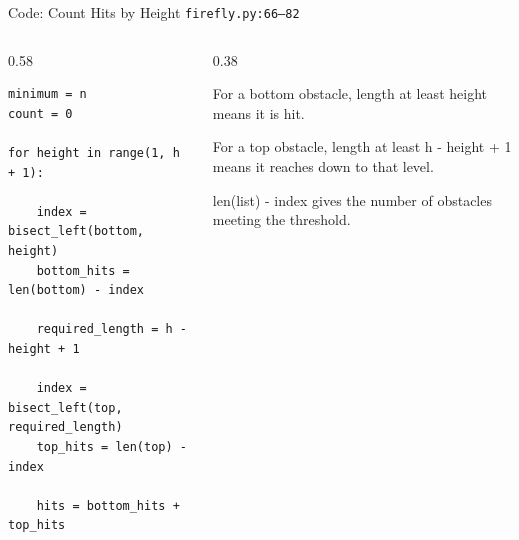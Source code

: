 \documentclass[aspectratio=169,11pt]{beamer}
\begin{document}
\begin{frame}[fragile]{Code: Count Hits by Height}
\scriptsize
{} \texttt{firefly.py:66--82}

\vspace{0.08cm}
\begin{columns}[T,totalwidth=\textwidth]
\begin{column}{0.58\textwidth}
\begin{lstlisting}[style=cpcode]
minimum = n
count = 0

for height in range(1, h + 1):

    index = bisect_left(bottom, height)
    bottom_hits = len(bottom) - index

    required_length = h - height + 1

    index = bisect_left(top, required_length)
    top_hits = len(top) - index

    hits = bottom_hits + top_hits
\end{lstlisting}
\end{column}
\begin{column}{0.38\textwidth}
\begin{tightitemize}
  \item For a bottom obstacle, length at least height means it is hit.
  \item For a top obstacle, length at least h - height + 1 means it reaches down to that level.
  \item len(list) - index gives the number of obstacles meeting the threshold.
\end{tightitemize}
\end{column}
\end{columns}
\end{frame}
\end{document}
